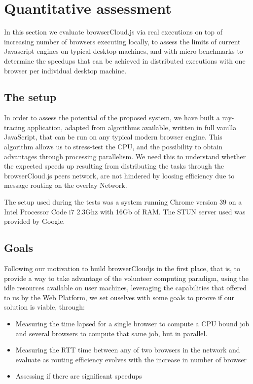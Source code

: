 \section{Quantitative assessment}

In this section we evaluate browserCloud.js via real executions on top of increasing number of browsers executing locally, to assess the limits of current Javascript engines on typical desktop machines, and with micro-benchmarks to determine the speedups that can be achieved in distributed executions with one browser per individual desktop machine.

\subsection{The setup}

In order to assess the potential of the proposed system, we have built a ray-tracing application, adapted from algorithms available, written in full vanilla JavaScript, that can be run on any typical modern browser engine. This algorithm allows us to stress-test the CPU,  and the possibility to obtain advantages through processing parallelism. We need this to understand whether the expected speeds up resulting from distributing the tasks through the browserCloud.js peers network, are not hindered by loosing efficiency due to message routing on the overlay Network.

The setup used during the tests was a system running Chrome version 39 on a Intel Processor Code i7 2.3Ghz with 16Gb of RAM. The STUN server used was provided by Google.

\subsection{Goals}

Following our motivation to build browserCloudjs in the first place, that is, to provide a way to take advantage of the volunteer computing paradigm, using the idle resources available on user machines, leveraging the capabilities that offered to us by the Web Platform, we set ouselves with some goals to proove if our solution is viable, through:

\begin{itemize}
    \item Measuring the time lapsed for a single browser to compute a CPU bound job and several browsers to compute that same job, but in parallel.
    \item Measuring the RTT time between any of two browsers in the network and evaluate as routing efficiency evolves with the increase in number of browser
    \item Assessing if there are significant speedups
\end{itemize}

